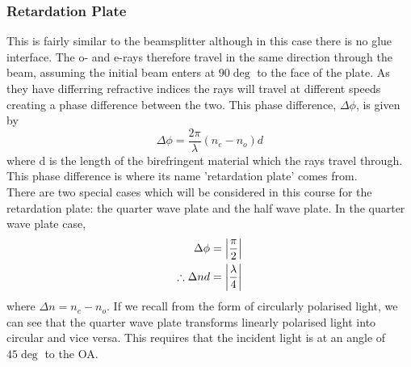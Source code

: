 \subsubsection{Retardation Plate}
This is fairly similar to the beamsplitter although in this case there is no glue interface.
The o- and e-rays therefore travel in the same direction through the beam, assuming the initial beam enters at \(90\deg\) to the face of the plate. 
As they have differring refractive indices the rays will travel at different speeds creating a phase difference between the two.
This phase difference, \(\Delta\phi\), is given by 
\begin{equation}
\Delta\phi = \frac{2\pi}{\lambda}\left(n_e - n_o\right)d
\label{eq:ItP:phase_difference}
\end{equation}
where d is the length of the birefringent material which the rays travel through.
This phase difference is where its name 'retardation plate' comes from.
\\
There are two special cases which will be considered in this course for the retardation plate: the quarter wave plate and the half wave plate.
In the quarter wave plate case, 
\begin{align*}
\Delta\phi &= \abs{\frac{\pi}{2}} \\
 \therefore \Delta{nd} &=\abs{\frac{\lambda}{4}} 
\end{align*}
where \(\Delta{n} = n_e-n_o\).
If we recall from the form of circularly polarised light, we can see that the quarter wave plate transforms linearly polarised light into circular and vice versa. 
This requires that the incident light is at an angle of \(45\deg\) to the OA. 
 

